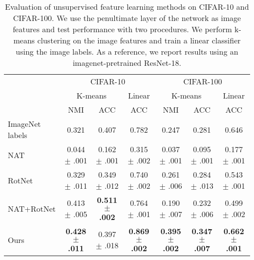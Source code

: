 \documentclass[a4paper,conference]{IEEEtran}
\begin{document}
\begin{table*}[t]
\begin{center}
\small
\caption{\protect\justify Evaluation of unsupervised feature learning methods on CIFAR-10 and CIFAR-100. We use the penultimate layer of the network as image features and test performance with two procedures. We perform k-means clustering on the image features and train a linear classifier using the image labels. As a reference, we report results using an imagenet-pretrained  ResNet-18.}
\label{table:nat_rotnet}
\begin{tabular}{l c c c c c c}
\toprule
& \multicolumn{3}{c}{CIFAR-10} & \multicolumn{3}{c}{CIFAR-100} \\
& \multicolumn{2}{c}{K-means} & Linear & \multicolumn{2}{c}{K-means} & Linear \\
& NMI & ACC & ACC & NMI & ACC & ACC \\
\midrule
ImageNet labels & 0.321 & 0.407 & 0.782 & 0.247 & 0.281 & 0.646 \\
\midrule
NAT & 0.044 $\pm$ .001 & 0.162 $\pm$ .001 & 0.315 $\pm$ .002 & 0.037 $\pm$ .001 & 0.095 $\pm$ .001 & 0.177 $\pm$ .001 \\
RotNet & 0.329 $\pm$ .011 & 0.349 $\pm$ .012 & 0.740 $\pm$ .002 & 0.261 $\pm$ .006 & 0.284 $\pm$ .013 & 0.543 $\pm$ .001 \\
NAT+RotNet & 0.413 $\pm$ .005 & \textbf{0.511 $\pm$ .002} & 0.764 $\pm$ .001 & 0.190 $\pm$ .007 & 0.232 $\pm$ .006 & 0.499 $\pm$ .002 \\
\midrule
Ours & \textbf{0.428 $\pm$ .011} & 0.397 $\pm$ .018 & \textbf{0.869 $\pm$ .002} & \textbf{0.395 $\pm$ .002} & \textbf{0.347 $\pm$ .007} & \textbf{0.662 $\pm$ .001} \\
\bottomrule
\end{tabular}

\end{center}
\end{table*}
\end{document}
